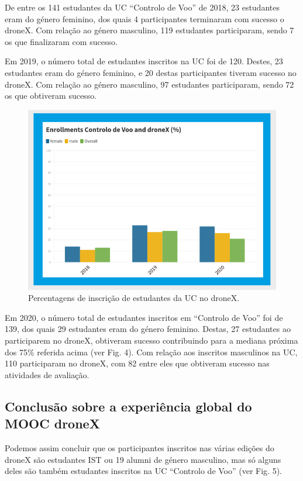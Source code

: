 De entre os 141 estudantes da UC “Controlo de Voo” de 2018, 23 estudantes eram do género feminino, dos quais 4 participantes terminaram com sucesso o droneX. Com relação ao género masculino, 119 estudantes participaram, sendo 7 os que finalizaram com sucesso.

Em 2019, o número total de estudantes inscritos na UC foi de 120. Destes, 23 estudantes eram do género feminino, e 20 destas participantes tiveram sucesso
no droneX. Com relação ao género masculino, 97
estudantes participaram, sendo 72 os que
obtiveram sucesso.

\begin{figure}
    \centering
    \includegraphics[width=.9\textwidth]{chaps/Images/enrollments_voo_drone.png}
    \caption{Percentagens de inscrição de estudantes da UC no droneX.}
    \label{fig:enrollment_voo_dronex}
\end{figure}

Em 2020, o número total de estudantes inscritos em “Controlo de Voo” foi de 139, dos quais 29 estudantes eram do género feminino. Destas, 27 estudantes ao participarem no droneX, obtiveram sucesso contribuindo para a
mediana próxima dos 75\% referida acima (ver
Fig. 4). Com relação aos inscritos masculinos na UC, 110 participaram no droneX, com 82 entre eles que obtiveram sucesso nas atividades de avaliação.

\subsection{Conclusão sobre a experiência global do MOOC droneX}

Podemos assim concluir que os participantes inscritos nas várias edições do droneX são estudantes IST ou 19 alumni de género masculino, mas só alguns deles são também estudantes inscritos na UC “Controlo de Voo”
(ver Fig. 5).

